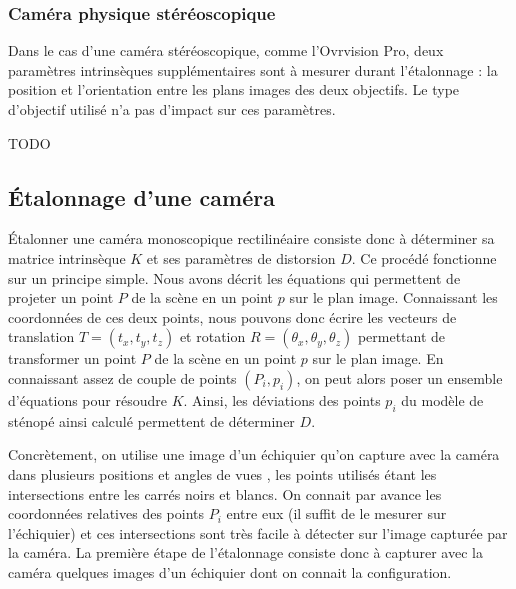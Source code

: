 \subsubsection{Caméra physique stéréoscopique}
Dans le cas d'une caméra stéréoscopique, comme l'Ovrvision Pro, deux paramètres intrinsèques supplémentaires sont à mesurer durant l'étalonnage : la position et l'orientation entre les plans images des deux objectifs. Le type d'objectif utilisé n'a pas d'impact sur ces paramètres.

TODO

\subsection{Étalonnage d'une caméra}
\label{subsec:pinhole_camera_calibration}
Étalonner une caméra monoscopique rectilinéaire consiste donc à déterminer sa matrice intrinsèque $K$ et ses paramètres de distorsion $D$. Ce procédé fonctionne sur un principe simple. Nous avons décrit les équations qui permettent de projeter un point $P$ de la scène en un point $p$ sur le plan image. Connaissant les coordonnées de ces deux points, nous pouvons donc écrire les vecteurs de translation $T = (t_x, t_y, t_z)$ et rotation $R = (\theta_x, \theta_y, \theta_z)$ permettant de transformer un point $P$ de la scène en un point $p$ sur le plan image. En connaissant assez de couple de points $(P_i, p_i)$, on peut alors poser un ensemble d'équations pour résoudre $K$. Ainsi, les déviations des points $p_i$ du modèle de sténopé ainsi calculé permettent de déterminer $D$.

Concrètement, on utilise une image d'un échiquier qu'on capture avec la caméra dans plusieurs positions et angles de vues , les points utilisés étant les intersections entre les carrés noirs et blancs. On connait par avance les coordonnées relatives des points $P_i$ entre eux (il suffit de le mesurer sur l'échiquier) et ces intersections sont très facile à détecter sur l'image capturée par la caméra. La première étape de l'étalonnage consiste donc à capturer avec la caméra quelques images d'un échiquier dont on connait la configuration.


